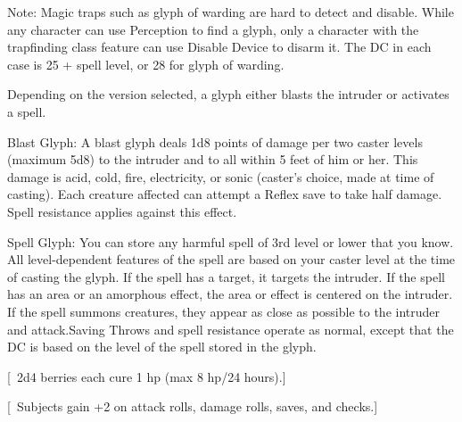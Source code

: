 {Note: Magic traps such as glyph of warding are hard to detect and disable. While any character can use Perception to find a glyph, only a character with the trapfinding class feature can use Disable Device to disarm it. The DC in each case is 25 + spell level, or 28 for glyph of warding.

Depending on the version selected, a glyph either blasts the intruder or activates a spell.

Blast Glyph: A blast glyph deals 1d8 points of damage per two caster levels (maximum 5d8) to the intruder and to all within 5 feet of him or her. This damage is acid, cold, fire, electricity, or sonic (caster's choice, made at time of casting). Each creature affected can attempt a Reflex save to take half damage. Spell resistance applies against this effect.

Spell Glyph: You can store any harmful spell of 3rd level or lower that you know. All level-dependent features of the spell are based on your caster level at the time of casting the glyph. If the spell has a target, it targets the intruder. If the spell has an area or an amorphous effect, the area or effect is centered on the intruder. If the spell summons creatures, they appear as close as possible to the intruder and attack.Saving Throws and spell resistance operate as normal, except that the DC is based on the level of the spell stored in the glyph.}
        
[ 2d4 berries each cure 1 hp (max 8 hp/24 hours).]
        
[ Subjects gain +2 on attack rolls, damage rolls, saves, and checks.]
        
